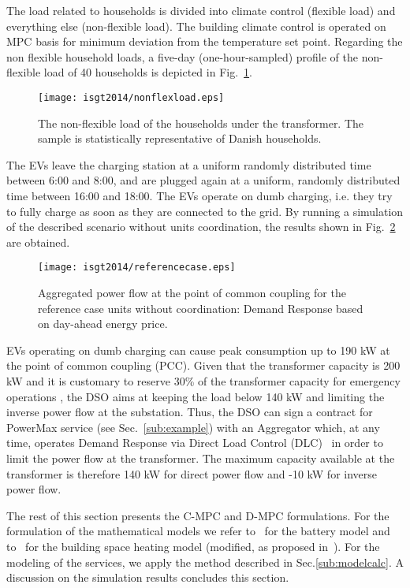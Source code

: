 The load related to households is divided into climate control (flexible load) and everything else (non-flexible load). The building climate control is operated on MPC basis for minimum deviation from the temperature set point. Regarding the non flexible household loads, a five-day (one-hour-sampled) profile of the non-flexible load of 40 households is depicted in Fig.~\ref{fig:nonflexible}.

\begin{figure}[t]  
	\centering
	\texttt{[image: isgt2014/nonflexload.eps]}
	\caption{The non-flexible load of the households under the transformer. The sample is statistically representative of Danish households.}\label{fig:nonflexible}
\end{figure}

The EVs leave the charging station at a uniform randomly distributed time between 6:00  and 8:00, and are plugged again at a uniform, randomly distributed time between 16:00 and 18:00. The EVs operate on dumb charging, i.e. they try to fully charge as soon as they are connected to the grid.  %
By running a simulation of the described scenario without units coordination, the results shown in Fig.~\ref{fig:referencecase} are obtained.

\begin{figure}[t]  
	\centering
	\texttt{[image: isgt2014/referencecase.eps]}
	\caption{Aggregated power flow at the point of common coupling for the reference case units without coordination: Demand Response based on day-ahead energy price.}\label{fig:referencecase}
\end{figure}

EVs operating on dumb charging can cause peak consumption up to 190 kW at the point of common coupling (PCC). Given that the transformer capacity is 200 kW and it is customary to reserve 30\% of the transformer capacity for emergency operations \cite{Engel}, the DSO aims at keeping the load below 140 kW and limiting the inverse power flow at the substation. Thus, the DSO can sign a contract for PowerMax service (see Sec.~\ref{sub:example}) with an Aggregator which, at any time, operates Demand Response via Direct Load Control (DLC)~\cite{Kosek} in order to limit the power flow at the transformer. The maximum capacity available at the transformer is therefore 140 kW for direct power flow and -10 kW for inverse power flow.

The rest of this section presents the C-MPC and D-MPC formulations. For the formulation of the mathematical models we refer to~\cite{6345063} for the battery model and to~\cite{Bacher20111511} for the building space heating model (modified, as proposed in~\cite{Costanzo}). For the modeling of the services, we apply the method described in Sec.\ref{sub:modelcalc}. A discussion on the simulation results concludes this section.
